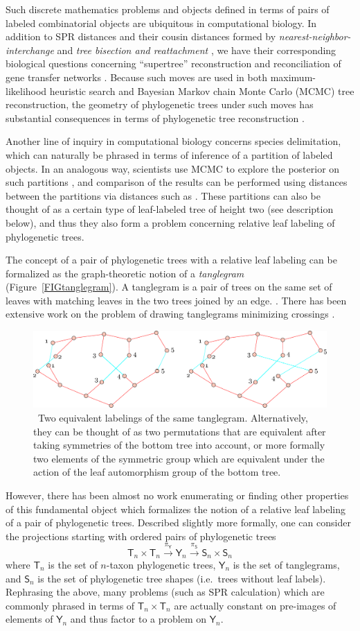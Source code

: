 \documentclass{amsart}
\newcommand{\tree}{\mathsf{T}}
\newcommand{\shape}{\mathsf{S}}
\newcommand{\tangle}{\mathsf{Y}}
\newcommand{\arxiv}[1]{#1}
\newcommand{\FIGtanglegram}{\
\label{FIGtanglegram}
\begin{figure}
  \arxiv{\includegraphics[width=5in]{figures/alternate-labeling}}
\caption{\
  Two equivalent labelings of the same tanglegram.
  Alternatively, they can be thought of as two permutations that are equivalent after taking symmetries of the bottom tree into account, or more formally two elements of the symmetric group which are equivalent under the action of the leaf automorphism group of the bottom tree.
}
\end{figure}
}
\begin{document}
Such discrete mathematics problems and objects defined in terms of pairs of labeled combinatorial objects are ubiquitous in computational biology.
In addition to SPR distances and their cousin distances formed by \emph{nearest-neighbor-interchange} and \emph{tree bisection and reattachment} \cite{wiki:treeRearrangement}, we have their corresponding biological questions concerning ``supertree'' reconstruction \cite{Whidden2014-ku} and reconciliation of gene transfer networks \cite{Boon2013-mc}.
Because such moves are used in both maximum-likelihood heuristic search and Bayesian Markov chain Monte Carlo (MCMC) tree reconstruction, the geometry of phylogenetic trees under such moves has substantial consequences in terms of phylogenetic tree reconstruction \cite{Whidden2014-yt}.

Another line of inquiry in computational biology concerns species delimitation, which can naturally be phrased in terms of inference of a partition of labeled objects.
In an analogous way, scientists use MCMC to explore the posterior on such partitions \cite{Yang2010-kc}, and comparison of the results can be performed using distances between the partitions via distances such as \cite{Gusfield2002-il}.
These partitions can also be thought of as a certain type of leaf-labeled tree of height two (see description below), and thus they also form a problem concerning relative leaf labeling of phylogenetic trees.

The concept of a pair of phylogenetic trees with a relative leaf labeling can be formalized as the graph-theoretic notion of a \emph{tanglegram} (Figure~\ref{FIGtanglegram}).
A tanglegram is a pair of trees on the same set of leaves with matching leaves in the two trees joined by an edge. \cite{Venkatachalam2010-zh}.
There has been extensive work on the problem of drawing tanglegrams minimizing crossings \cite{Buchin2008-lc,Lozano2008-tp,Bansal2009-ni,Bocker2009-xl,Fernau2010-an,Venkatachalam2010-zh}.
\FIGtanglegram

However, there has been almost no work enumerating or finding other properties of this fundamental object which formalizes the notion of a relative leaf labeling of a pair of phylogenetic trees.
Described slightly more formally, one can consider the projections starting with ordered pairs of phylogenetic trees
\begin{equation}
\label{eq:projChain}
\tree_n \times \tree_n \xrightarrow{\pi_\tangle} \tangle_n \xrightarrow{\pi_\shape} \shape_n \times \shape_n
\end{equation}
where $\tree_n$ is the set of $n$-taxon phylogenetic trees, $\tangle_n$ is the set of tanglegrams, and $\shape_n$ is the set of phylogenetic tree shapes (i.e.\ trees without leaf labels).
Rephrasing the above, many problems (such as SPR calculation) which are commonly phrased in terms of $\tree_n \times \tree_n$ are actually constant on pre-images of elements of $\tangle_n$ and thus factor to a problem on $\tangle_n$.
\end{document}
